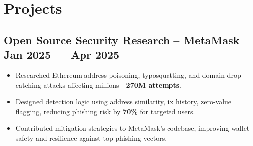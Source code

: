 \documentclass[a4,10pt]{article}
\newenvironment{zitemize}{
\begin{itemize}\itemsep0pt \parskip0pt \parsep1pt}
{\end{itemize}\vspace{-0.5cm}}
\begin{document}
\vspace{-0.2cm}
    
\section{Projects}

\vspace{-0.1cm}
\subsection*{Open Source Security Research – MetaMask \hfill Jan 2025 --- Apr 2025}
\begin{zitemize}
  \item Researched Ethereum address poisoning, typosquatting, and domain drop-catching attacks affecting millions—\textbf{270M attempts}.
  \item Designed detection logic using address similarity, tx history, zero-value flagging, reducing phishing risk by \textbf{70\%} for targeted users.
  \item Contributed mitigation strategies to MetaMask’s codebase, improving wallet safety and resilience against top phishing vectors.
\end{zitemize}
\end{document}

